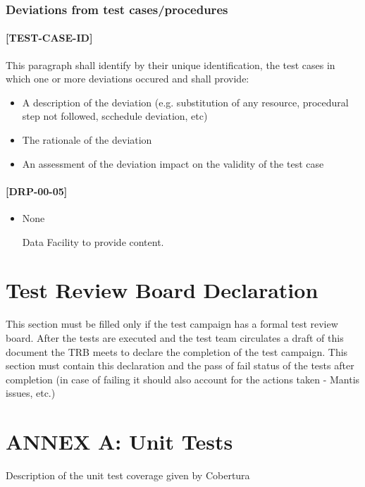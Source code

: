 \documentclass[DM,lsstdraft,STR,toc]{lsstdoc}
\begin{document}
\subsubsection{Deviations from test cases/procedures}
\paragraph{[TEST-CASE-ID]}
This paragraph shall identify by their unique identification, the test cases in which one or more deviations occured and shall provide:
\begin{itemize}
\item A description of the deviation (e.g. substitution of any resource, procedural step not followed, scchedule deviation, etc)
\item The rationale of the deviation
\item An assessment of the deviation impact on the validity of the test case
\end{itemize}

\paragraph{[DRP-00-05]}
\begin{itemize}
  \item None
\begin{note}
Data Facility to provide content.
\end{note}
\end{itemize}

\newpage

\section{Test Review Board Declaration\label{sect:trb}}
This section must be filled only if the test campaign has a  formal
test review board.
After the tests are executed and the test team circulates a draft of
this document the TRB meets to declare the completion of the test campaign.
This section must contain this declaration and the pass of fail status
of the tests after completion (in case of failing it should also account
for the actions taken - Mantis issues, etc.)

\newpage

\appendix
\section{ANNEX A: Unit Tests \label{sect:unit_tests}}
Description of the unit test coverage given by Cobertura
\end{document}
